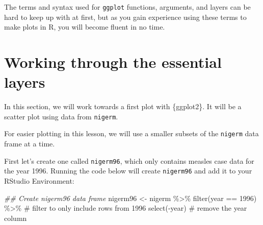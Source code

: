 \documentclass[
  letterpaper,
  DIV=11,
  numbers=noendperiod]{scrreprt}
\newenvironment{Shaded}{\begin{snugshade}}{\end{snugshade}}
\newcommand{\CommentTok}[1]{\textcolor[rgb]{0.37,0.37,0.37}{#1}}
\newcommand{\DecValTok}[1]{\textcolor[rgb]{0.68,0.00,0.00}{#1}}
\newcommand{\DocumentationTok}[1]{\textcolor[rgb]{0.37,0.37,0.37}{\textit{#1}}}
\newcommand{\FunctionTok}[1]{\textcolor[rgb]{0.28,0.35,0.67}{#1}}
\newcommand{\NormalTok}[1]{\textcolor[rgb]{0.00,0.23,0.31}{#1}}
\newcommand{\OtherTok}[1]{\textcolor[rgb]{0.00,0.23,0.31}{#1}}
\newcommand{\SpecialCharTok}[1]{\textcolor[rgb]{0.37,0.37,0.37}{#1}}
\begin{document}
\begin{tcolorbox}[enhanced jigsaw, titlerule=0mm, colback=white, left=2mm, breakable, opacitybacktitle=0.6, colbacktitle=quarto-callout-note-color!10!white, colframe=quarto-callout-note-color-frame, bottomtitle=1mm, opacityback=0, coltitle=black, arc=.35mm, toptitle=1mm, title=\textcolor{quarto-callout-note-color}{\faInfo}\hspace{0.5em}{Challenge}, leftrule=.75mm, toprule=.15mm, bottomrule=.15mm, rightrule=.15mm]

The terms and syntax used for \texttt{ggplot} functions, arguments, and
layers can be hard to keep up with at first, but as you gain experience
using these terms to make plots in R, you will become fluent in no time.

\end{tcolorbox}

\section{Working through the essential
layers}\label{working-through-the-essential-layers}

In this section, we will work towards a first plot with \{ggplot2\}. It
will be a scatter plot using data from \texttt{nigerm}.

For easier plotting in this lesson, we will use a smaller subsets of the
\texttt{nigerm} data frame at a time.

First let's create one called \texttt{nigerm96}, which only contains
measles case data for the year 1996. Running the code below will create
\texttt{nigerm96} and add it to your RStudio Environment:

\begin{Shaded}
\begin{Highlighting}[]
\DocumentationTok{\#\# Create nigerm96 data frame}
\NormalTok{nigerm96 }\OtherTok{\textless{}{-}}\NormalTok{ nigerm }\SpecialCharTok{\%\textgreater{}\%}   
  \FunctionTok{filter}\NormalTok{(year }\SpecialCharTok{==} \DecValTok{1996}\NormalTok{)  }\SpecialCharTok{\%\textgreater{}\%} \CommentTok{\# filter to only include rows from 1996}
  \FunctionTok{select}\NormalTok{(}\SpecialCharTok{{-}}\NormalTok{year) }\CommentTok{\# remove the year column}
\end{Highlighting}
\end{Shaded}
\end{document}
